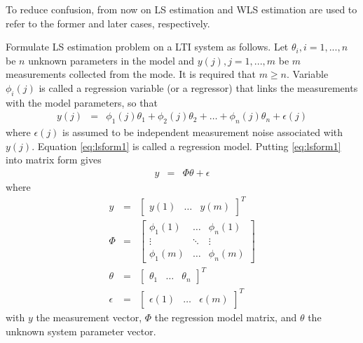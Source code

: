 To reduce confusion, from now on LS estimation and WLS estimation are used to refer to the former and later cases, respectively.

Formulate LS estimation problem on a LTI system as follows. Let $\theta_i, i=1,...,n$ be $n$ unknown parameters in the model and $y(j), j=1,...,m$ be $m$ measurements collected from the mode. It is required that $m\geq n$. Variable $\phi_i(j)$ is called a regression variable (or a regressor) that links the measurements with the model parameters, so that
\begin{eqnarray}
	y(j) &=& \phi_1(j)\theta_1 + \phi_2(j)\theta_2 + \ldots + \phi_n(j)\theta_n + \epsilon(j) \label{eq:lsform1}
\end{eqnarray}
where $\epsilon(j)$ is assumed to be independent measurement noise associated with $y(j)$. Equation \eqref{eq:lsform1} is called a regression model. Putting \eqref{eq:lsform1} into matrix form gives
\begin{eqnarray}
	y &=& \Phi \theta + \epsilon \label{eq:lsform2}
\end{eqnarray}
where
\begin{eqnarray}
	y &=& \left[\begin{array}{ccc}
	              y(1) & \ldots & y(m)
	            \end{array}\right]^T \nonumber \\
	\Phi &=& \left[\begin{array}{ccc}
		\phi_1(1) & \ldots & \phi_n(1) \\
		\vdots & \ddots & \vdots \\
		\phi_1(m) & \ldots & \phi_n(m)
	\end{array}\right] \nonumber \\
	\theta &=& \left[\begin{array}{ccc}
	                   \theta_1 & \ldots & \theta_n
	                 \end{array}\right]^T \nonumber \\
    \epsilon &=& \left[\begin{array}{ccc}
                         \epsilon(1) & \ldots & \epsilon(m)
                       \end{array}\right]^T \nonumber
\end{eqnarray}
with $y$ the measurement vector, $\Phi$ the regression model matrix, and $\theta$ the unknown system parameter vector.


